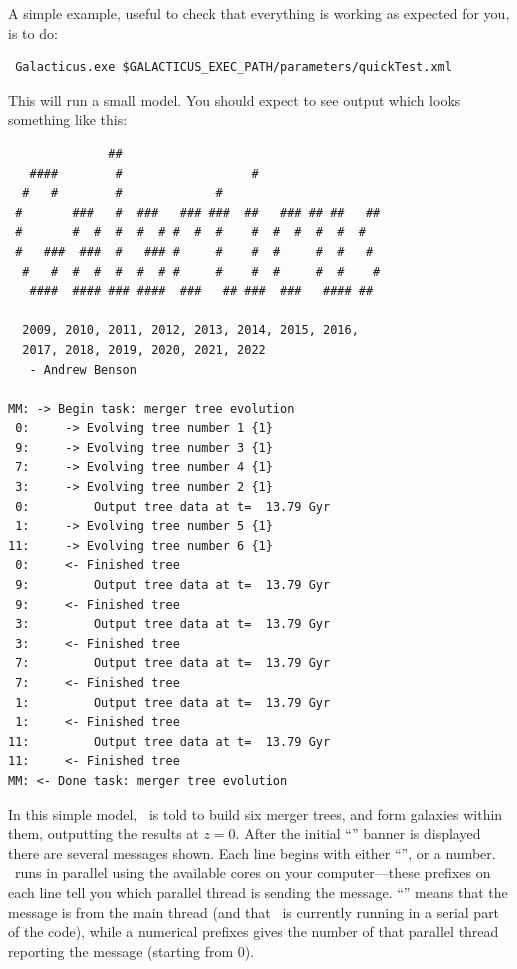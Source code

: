 A simple example, useful to check that everything is working as expected for you, is to do:
\begin{verbatim}
 Galacticus.exe $GALACTICUS_EXEC_PATH/parameters/quickTest.xml
\end{verbatim}
This will run a small model. You should expect to see output which looks something like this:
\begin{verbatim}
              ##                                     
   ####        #                  #                  
  #   #        #             #                       
 #       ###   #  ###   ### ###  ##   ### ## ##   ## 
 #       #  #  #  #  # #  #  #    #  #  #  #  #  #   
 #   ###  ###  #   ### #     #    #  #     #  #   #  
  #   #  #  #  #  #  # #     #    #  #     #  #    # 
   ####  #### ### ####  ###   ## ###  ###   #### ##  

  2009, 2010, 2011, 2012, 2013, 2014, 2015, 2016,
  2017, 2018, 2019, 2020, 2021, 2022
   - Andrew Benson

MM: -> Begin task: merger tree evolution
 0:     -> Evolving tree number 1 {1}
 9:     -> Evolving tree number 3 {1}
 7:     -> Evolving tree number 4 {1}
 3:     -> Evolving tree number 2 {1}
 0:         Output tree data at t=  13.79 Gyr
 1:     -> Evolving tree number 5 {1}
11:     -> Evolving tree number 6 {1}
 0:     <- Finished tree
 9:         Output tree data at t=  13.79 Gyr
 9:     <- Finished tree
 3:         Output tree data at t=  13.79 Gyr
 3:     <- Finished tree
 7:         Output tree data at t=  13.79 Gyr
 7:     <- Finished tree
 1:         Output tree data at t=  13.79 Gyr
 1:     <- Finished tree
11:         Output tree data at t=  13.79 Gyr
11:     <- Finished tree
MM: <- Done task: merger tree evolution
\end{verbatim}
In this simple model, \glc\ is told to build six merger trees, and form galaxies within them, outputting the results at $z=0$. After the initial ``\glc'' banner is displayed there are several messages shown. Each line begins with either ``'', or a number. \glc\ runs in parallel using the available cores on your computer---these prefixes on each line tell you which parallel thread is sending the message. ``'' means that the message is from the main thread (and that \glc\ is currently running in a serial part of the code), while a numerical prefixes gives the number of that parallel thread reporting the message (starting from 0).

